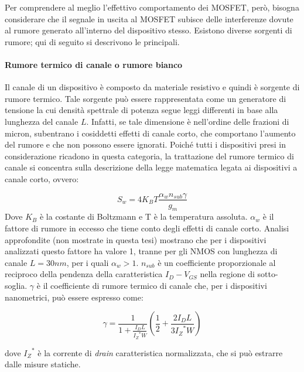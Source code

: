 \vspace*{0.5cm}

Per comprendere al meglio l'effettivo comportamento dei MOSFET, però, bisogna considerare che il segnale in uscita al MOSFET subisce delle interferenze dovute al rumore generato all'interno del dispositivo stesso. Esistono diverse sorgenti di rumore; qui di seguito si descrivono le principali.

\paragraph*{Rumore termico di canale o rumore bianco}
Il canale di un dispositivo è composto da materiale resistivo e quindi è sorgente di rumore termico. Tale sorgente può essere rappresentata come un generatore di tensione la cui densità spettrale di potenza segue leggi differenti in base alla lunghezza del canale $L$.  Infatti, se tale dimensione è nell'ordine delle frazioni di micron, subentrano i cosiddetti effetti di canale corto, che comportano l'aumento del rumore e che non possono essere ignorati.
Poiché tutti i dispositivi presi in considerazione ricadono in questa categoria, la trattazione del rumore termico di canale si concentra sulla descrizione della legge matematica legata ai dispositivi a canale corto, ovvero:

\begin{equation}
  S_w = 4 K_B T \frac{\alpha_w n_{sub} \gamma}{g_m}
\end{equation}
Dove $K_B$ è la costante di Boltzmann e T è la temperatura assoluta. $\alpha_w$ è il fattore di rumore in eccesso che tiene conto degli effetti di canale corto. Analisi approfondite (non mostrate in questa tesi) mostrano che per i dispositivi analizzati questo fattore ha valore 1, tranne per gli NMOS con lunghezza di canale $L = 30nm$, per i quali $\alpha_w > 1$. $n_{sub}$ è un coefficiente proporzionale al reciproco della pendenza della caratteristica $I_D-V_{GS}$ nella regione di sotto-soglia. $\gamma$ è il coefficiente di rumore termico di canale che, per i dispositivi nanometrici, può essere espresso come:

\begin{equation}
  \gamma = \frac{1}{1 +  \frac {I_D L}{{I_Z}^* W}}\left(\frac{1}{2} + \frac{ 2 I_D L}{3 {I_Z}^* W}\right)
\end{equation}

dove ${I_Z}^*$ è la corrente di \emph{drain} caratteristica normalizzata, che si può estrarre dalle misure statiche.

